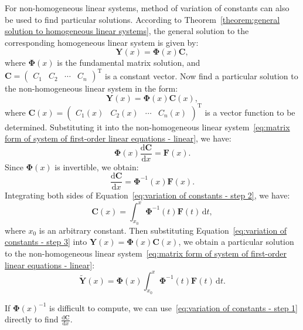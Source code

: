 \documentclass[11pt]{../../TexTemplate/elegantbook}
\begin{document}
For non-homogeneous linear systems, method of variation of constants can also be used to find particular solutions.
According to Theorem~\ref{theorem:general solution to homogeneous linear systems},
the general solution to the corresponding homogeneous linear system is given by:
\[
\mathbf{Y}(x) = \mathbf{\Phi}(x) \mathbf{C},
\]
where \(\mathbf{\Phi}(x)\) is the fundamental matrix solution,
and \(\mathbf{C}=\begin{pmatrix} C_{1} & C_{2} & \cdots & C_{n} \end{pmatrix}^{\mathrm{T}}\) is a constant vector.
Now find a particular solution to the non-homogeneous linear system in the form:
\[
\mathbf{Y}(x) = \mathbf{\Phi}(x) \mathbf{C}(x),
\]
where \(\mathbf{C}(x)=\begin{pmatrix} C_{1}(x) & C_{2}(x) & \cdots & C_{n}(x) \end{pmatrix}^{\mathrm{T}}\) 
is a vector function to be determined.
Substituting it into the non-homogeneous linear system~\eqref{eq:matrix form of system of first-order linear equations - linear},
we have:
\begin{equation}\label{eq:variation of constants - step 1}
    \mathbf{\Phi}(x) \frac{\mathrm{d}\mathbf{C}}{\mathrm{d}x} = \mathbf{F}(x).
\end{equation}
Since \(\mathbf{\Phi}(x)\) is invertible, we obtain:
\begin{equation}\label{eq:variation of constants - step 2}
    \frac{\mathrm{d}\mathbf{C}}{\mathrm{d}x} = \mathbf{\Phi}^{-1}(x) \mathbf{F}(x).
\end{equation}
Integrating both sides of Equation~\eqref{eq:variation of constants - step 2}, we have:
\begin{equation}\label{eq:variation of constants - step 3}
    \mathbf{C}(x) = \int_{x_{0}}^{x} \mathbf{\Phi}^{-1}(t) \mathbf{F}(t) \, \mathrm{d}t,
\end{equation}
where \(x_{0}\) is an arbitrary constant.
Then substituting Equation~\eqref{eq:variation of constants - step 3} into
\(\mathbf{Y}(x) = \mathbf{\Phi}(x) \mathbf{C}(x)\), 
we obtain a particular solution to the non-homogeneous linear 
system~\eqref{eq:matrix form of system of first-order linear equations - linear}:
\begin{equation}\label{eq:particular solution by variation of constants}
    \tilde{\mathbf{Y}}(x) = \mathbf{\Phi}(x) \int_{x_{0}}^{x} \mathbf{\Phi}^{-1}(t) \mathbf{F}(t) \, \mathrm{d}t.
\end{equation}

\begin{remark}
    If \(\mathbf{\Phi}(x)^{-1}\) is difficult to compute,
    we can use~\eqref{eq:variation of constants - step 1} directly to find \(\frac{\mathrm{d}\mathbf{C}}{\mathrm{d}x}\).
\end{remark}
\end{document}
